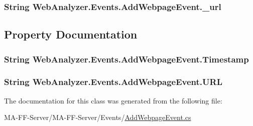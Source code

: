 \subsubsection[{\+\_\+url}]{\setlength{\rightskip}{0pt plus 5cm}String Web\+Analyzer.\+Events.\+Add\+Webpage\+Event.\+\_\+url\hspace{0.3cm}{\ttfamily [private]}}\label{class_web_analyzer_1_1_events_1_1_add_webpage_event_a514a144e2cc984ecec6593547732c55f}


\subsection{Property Documentation}
\hypertarget{class_web_analyzer_1_1_events_1_1_add_webpage_event_a4d534a36b31fcd6ee317a7d214b31ba7}{}
\subsubsection[{Timestamp}]{\setlength{\rightskip}{0pt plus 5cm}String Web\+Analyzer.\+Events.\+Add\+Webpage\+Event.\+Timestamp\hspace{0.3cm}{\ttfamily [get]}}\label{class_web_analyzer_1_1_events_1_1_add_webpage_event_a4d534a36b31fcd6ee317a7d214b31ba7}
\hypertarget{class_web_analyzer_1_1_events_1_1_add_webpage_event_a81c2419e44f174687def7a813525fe00}{}
\subsubsection[{U\+R\+L}]{\setlength{\rightskip}{0pt plus 5cm}String Web\+Analyzer.\+Events.\+Add\+Webpage\+Event.\+U\+R\+L\hspace{0.3cm}{\ttfamily [get]}}\label{class_web_analyzer_1_1_events_1_1_add_webpage_event_a81c2419e44f174687def7a813525fe00}


The documentation for this class was generated from the following file\+:\begin{DoxyCompactItemize}
\item 
M\+A-\/\+F\+F-\/\+Server/\+M\+A-\/\+F\+F-\/\+Server/\+Events/\hyperlink{_add_webpage_event_8cs}{Add\+Webpage\+Event.\+cs}\end{DoxyCompactItemize}
